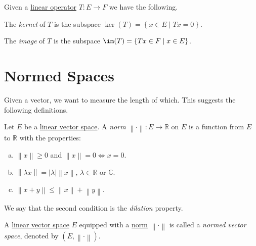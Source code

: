 \begin{definition*}
	Given a \hyperref[def:linear-op]{linear operator} \(T\colon E \to F\) we have the following.
	\begin{definition}[Kernel]\label{def:kernel}
		The \emph{kernel} of \(T\) is the subspace \(\ker(T) = \left\{ x\in E\mid Tx=0 \right\} \).
	\end{definition}

	\begin{definition}[Image]\label{def:image}
		The \emph{image} of \(T\) is the subspace \(\im(T) = \left\{ Tx\in F\mid x\in E \right\} \).
	\end{definition}
\end{definition*}

\section{Normed Spaces}
Given a vector, we want to measure the length of which. This suggests the following definitions.

\begin{definition}[Norm]\label{def:norm}
	Let \(E\) be a \hyperref[def:linear-vector-space]{linear vector space}. A \emph{norm} \(\left\lVert \cdot \right\rVert \colon E \to \mathbb{R} \) on \(E\) is a function from \(E\) to \(\mathbb{R} \) with the properties:
	\begin{enumerate}[(a)]
		\item \(\left\lVert x\right\rVert \geq 0\) and \(\left\lVert x\right\rVert =0 \iff x=0\).
		\item \(\left\lVert \lambda x\right\rVert = \left\vert \lambda  \right\vert \left\lVert x\right\rVert\), \(\lambda \in\mathbb{R} \) or \(\mathbb{C} \).
		\item \(\left\lVert x+y\right\rVert \leq \left\lVert x\right\rVert + \left\lVert y\right\rVert \).
	\end{enumerate}
\end{definition}

\begin{notation}[Dilation]
	We say that the second condition is the \emph{dilation} property.
\end{notation}

\begin{definition}\label{def:normed-vector-space}
	A \hyperref[def:linear-vector-space]{linear vector space} \(E\) equipped with a \hyperref[def:norm]{norm} \(\left\lVert \cdot\right\rVert \) is called a \emph{normed vector space}, denoted by \((E, \left\lVert \cdot\right\rVert )\).
\end{definition}

